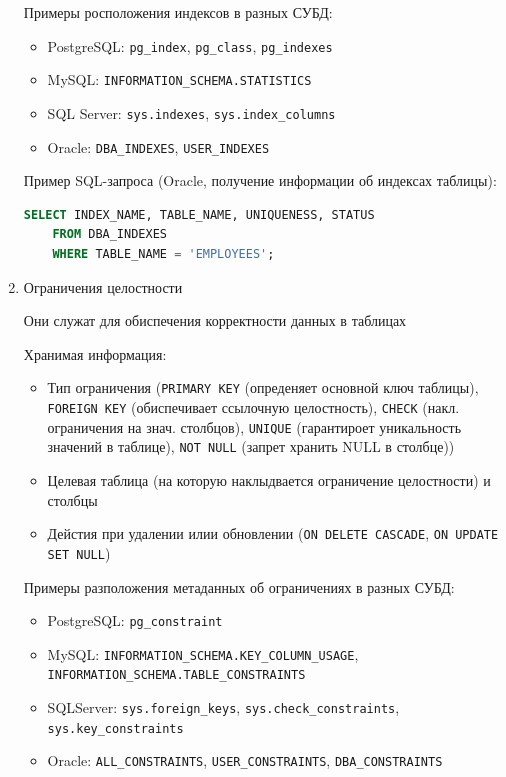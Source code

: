 \begin{enumerate}
    Примеры росположения индексов в разных СУБД:
    \begin{itemize}
        \item PostgreSQL: \texttt{pg\_index}, \texttt{pg\_class}, \texttt{pg\_indexes}
        \item MySQL: \texttt{INFORMATION\_SCHEMA.STATISTICS}
        \item SQL Server: \texttt{sys.indexes}, \texttt{sys.index\_columns}
        \item Oracle: \texttt{DBA\_INDEXES}, \texttt{USER\_INDEXES}
    \end{itemize}

    Пример SQL-запроса (Oracle, получение информации об индексах таблицы):
    \begin{lstlisting}[language=SQL]
    SELECT INDEX_NAME, TABLE_NAME, UNIQUENESS, STATUS 
    FROM DBA_INDEXES 
    WHERE TABLE_NAME = 'EMPLOYEES';
    \end{lstlisting}

    \item Ограничения целостности \autocites[§51.13]{PostgreSQLdocc51}[§28.3.42]{Mysqldoc1}{MicrosoftLearnSQLserverTab}

    Они служат для обиспечения корректности данных в таблицах

    Хранимая информация:
    \begin{itemize}
        \item Тип ограничения (\texttt{PRIMARY KEY} (опреденяет основной ключ таблицы), \texttt{FOREIGN KEY} (обиспечивает ссылочную целостность), \texttt{CHECK} (накл. ограничения на знач. столбцов), \texttt{UNIQUE} (гарантироет уникальность значений в таблице), \texttt{NOT NULL} (запрет хранить NULL в столбце))
        \item Целевая таблица (на которую наклыдвается ограничение целостности) и столбцы
        \item Дейстия при удалении илии обновлении (\texttt{ON DELETE CASCADE}, \texttt{ON UPDATE SET NULL})
    \end{itemize}

    Примеры разположения метаданных об ограничениях в разных СУБД:
    \begin{itemize}
        \item PostgreSQL: \texttt{pg\_constraint}
        \item MySQL: \texttt{INFORMATION\_SCHEMA.KEY\_COLUMN\_USAGE}, \texttt{INFORMATION\_SCHEMA.TABLE\_CONSTRAINTS}
        \item SQLServer: \texttt{sys.foreign\_keys}, \texttt{sys.check\_constraints}, \texttt{sys.key\_constraints}
        \item Oracle: \texttt{ALL\_CONSTRAINTS}, \texttt{USER\_CONSTRAINTS}, \texttt{DBA\_CONSTRAINTS}
    \end{itemize}


\end{enumerate}
